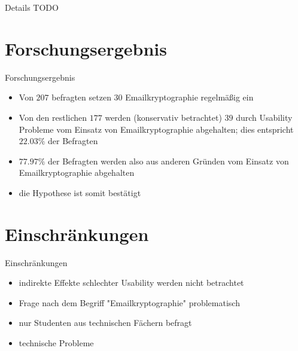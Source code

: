 \documentclass[]{beamer}
\begin{document}
\begin{frame}{Details}
	TODO
\end{frame}

\section{Forschungsergebnis}
\begin{frame}{Forschungsergebnis}
\begin{itemize}
	\item Von $207$ befragten setzen $30$ Emailkryptographie regelmäßig ein
	\item Von den restlichen $177$ werden (konservativ betrachtet) $39$ durch Usability Probleme
		vom Einsatz von Emailkryptographie abgehalten; dies entspricht $22.03\%$ der Befragten
	\item $77.97\%$ der Befragten werden also aus anderen Gründen vom Einsatz von Emailkryptographie abgehalten
	\item<2> die Hypothese ist somit bestätigt
\end{itemize}
\end{frame}

\section{Einschränkungen}
\begin{frame}{Einschränkungen}
	  \begin{itemize}
    \item indirekte Effekte schlechter Usability werden nicht betrachtet
    \item Frage nach dem Begriff "Emailkryptographie" problematisch
    \item nur Studenten aus technischen Fächern befragt
    \item technische Probleme
	\end{itemize}
\end{frame}
\end{document}

